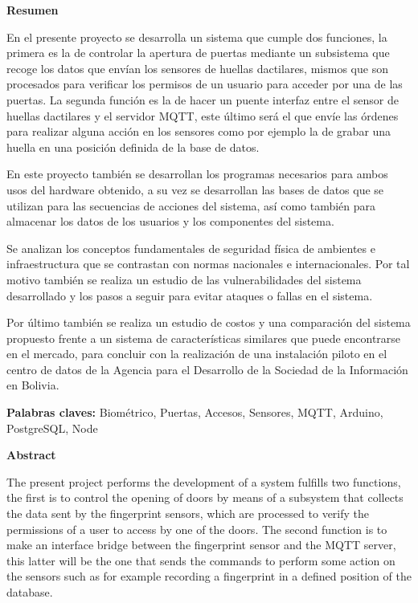 \documentclass[../principal.tex]{subfiles}
\begin{document}
  \thispagestyle{empty}
  \begin{center}
    \textbf{Resumen}
  \end{center}

  En el presente proyecto se desarrolla un sistema que cumple dos funciones, la primera es la de controlar la apertura de puertas mediante un subsistema que recoge los datos que envían los sensores de huellas dactilares, mismos que son procesados para verificar los permisos de un usuario para acceder por una de las puertas. La segunda función es la de hacer un puente interfaz entre el sensor de huellas dactilares y el servidor MQTT, este último será el que envíe las órdenes para realizar alguna acción en los sensores como por ejemplo la de grabar una huella en una posición definida de la base de datos.

  En este proyecto también se desarrollan los programas necesarios para ambos usos del hardware obtenido, a su vez se desarrollan las bases de datos que se utilizan para las secuencias de acciones del sistema, así como también para almacenar los datos de los usuarios y los componentes del sistema.

  Se analizan los conceptos fundamentales de seguridad física de ambientes e infraestructura que se contrastan con normas nacionales e internacionales. Por tal motivo también se realiza un estudio de las vulnerabilidades del sistema desarrollado y los pasos a seguir para evitar ataques o fallas en el sistema.

  Por último también se realiza un estudio de costos y una comparación del sistema propuesto frente a un sistema de características similares que puede encontrarse en el mercado, para concluir con la realización de una instalación piloto en el centro de datos de la Agencia para el Desarrollo de la Sociedad de la Información en Bolivia.

  \textbf{Palabras claves: } Biométrico, Puertas, Accesos, Sensores, MQTT, Arduino, PostgreSQL, Node

  \newpage
  \thispagestyle{empty}
  \begin{center}
    \textbf{Abstract}
  \end{center}

    The present project performs the development of a system fulfills two functions, the first is to control the opening of doors by means of a subsystem that collects the data sent by the fingerprint sensors, which are processed to verify the permissions of a user to access by one of the doors. The second function is to make an interface bridge between the fingerprint sensor and the MQTT server, this latter will be the one that sends the commands to perform some action on the sensors such as for example recording a fingerprint in a defined position of the database.
\end{document}
